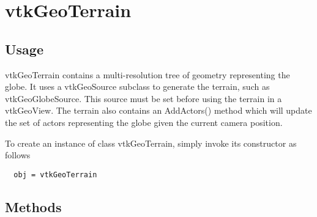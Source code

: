 \section{vtkGeoTerrain}

\subsection{Usage}

 vtkGeoTerrain contains a multi-resolution tree of geometry representing
 the globe. It uses a vtkGeoSource subclass to generate the terrain, such
 as vtkGeoGlobeSource. This source must be set before using the terrain in
 a vtkGeoView. The terrain also contains an AddActors() method which
 will update the set of actors representing the globe given the current
 camera position.

To create an instance of class vtkGeoTerrain, simply
invoke its constructor as follows
\begin{verbatim}
  obj = vtkGeoTerrain
\end{verbatim}
\subsection{Methods}

